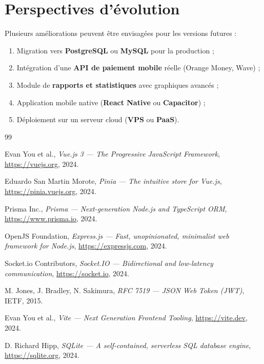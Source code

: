 \documentclass[12pt, a4paper]{report}
\begin{document}
\section{Perspectives d'évolution}

Plusieurs améliorations peuvent être envisagées pour les versions futures :

\begin{enumerate}
  \item Migration vers \textbf{PostgreSQL} ou \textbf{MySQL} pour la production ;
  \item Intégration d'une \textbf{API de paiement mobile} réelle (Orange Money,
        Wave) ;
  \item Module de \textbf{rapports et statistiques} avec graphiques avancés ;
  \item Application mobile native (\textbf{React Native} ou \textbf{Capacitor}) ;
  \item Déploiement sur un serveur cloud (\textbf{VPS} ou \textbf{PaaS}).
\end{enumerate}

\begin{thebibliography}{99}

  Evan You et al.,
  \textit{Vue.js 3 — The Progressive JavaScript Framework},
  \url{https://vuejs.org}, 2024.

  Eduardo San Martin Morote,
  \textit{Pinia — The intuitive store for Vue.js},
  \url{https://pinia.vuejs.org}, 2024.

  Prisma Inc.,
  \textit{Prisma — Next-generation Node.js and TypeScript ORM},
  \url{https://www.prisma.io}, 2024.

  OpenJS Foundation,
  \textit{Express.js — Fast, unopinionated, minimalist web framework for Node.js},
  \url{https://expressjs.com}, 2024.

  Socket.io Contributors,
  \textit{Socket.IO — Bidirectional and low-latency communication},
  \url{https://socket.io}, 2024.

  M. Jones, J. Bradley, N. Sakimura,
  \textit{RFC 7519 — JSON Web Token (JWT)},
  IETF, 2015.

  Evan You et al.,
  \textit{Vite — Next Generation Frontend Tooling},
  \url{https://vite.dev}, 2024.

  D. Richard Hipp,
  \textit{SQLite — A self-contained, serverless SQL database engine},
  \url{https://sqlite.org}, 2024.

\end{thebibliography}
\end{document}
